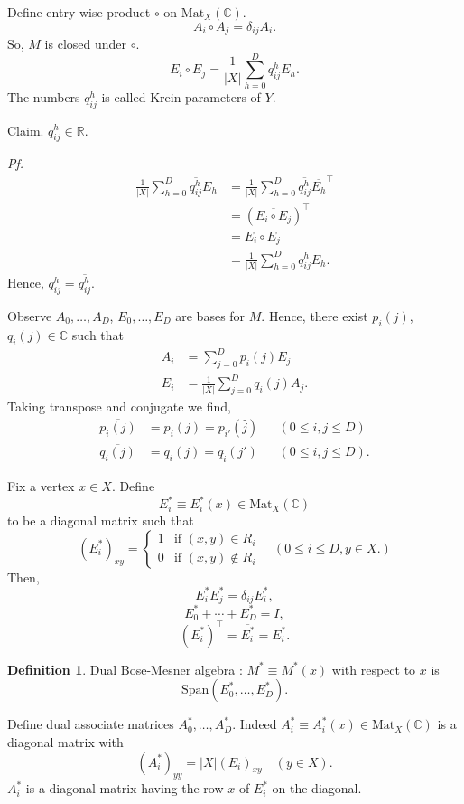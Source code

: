 \documentclass[
]{book}
\theoremstyle{definition}
\newtheorem{definition}{Definition}[chapter]
\theoremstyle{definition}
\theoremstyle{definition}
\theoremstyle{definition}
\theoremstyle{remark}
\begin{document}
Define entry-wise product \(\circ\) on \(\mathrm{Mat}_X(\mathbb{C})\).
\[A_i \circ A_j = \delta_{ij}A_i.\]
So, \(M\) is closed under \(\circ\).
\[E_i \circ E_j = \frac{1}{|X|}\sum_{h=0}^D q^h_{ij}E_h.\]
The numbers \(q^h_{ij}\) is called Krein parameters of \(Y\).

Claim. \(q^h_{ij}\in \mathbb{R}\).

\emph{Pf.}
\begin{align}
\frac{1}{|X|}\sum_{h=0}^D \overline{q^h_{ij}}E_h & = \frac{1}{|X|}\sum_{h=0}^D \overline{q^h_{ij}}\overline{E_h}^\top \\
& = (\overline{E_i\circ E_j})^\top \\
& = E_i\circ E_j \\
& = \frac{1}{|X|}\sum_{h=0}^D q^h_{ij}E_h.
\end{align}
Hence, \(q^h_{ij} = \overline{q^h_{ij}}\).

Observe
\(A_0, \ldots, A_D\), \(E_0, \ldots, E_D\) are bases for \(M\). Hence, there exist \(p_i(j)\), \(q_i(j)\in \mathbb{C}\) such that
\begin{align}
A_i & = \sum_{j = 0}^D p_i(j)E_j\\
E_i & = \frac{1}{|X|}\sum_{j=0}^D q_i(j)A_j.
\end{align}
Taking transpose and conjugate we find,
\begin{align}
\overline{p_i(j)} & =  p_i(j)  =  p_{i'}(\hat{j}) && (0\leq i,j\leq D)\\
\overline{q_i(j)} & =  q_i(j)  =  q_{\hat{i}}({j}') && (0\leq i,j\leq D).
\end{align}

Fix a vertex \(x\in X\). Define
\[E^*_i \equiv E^*_i(x) \in \mathrm{Mat}_X(\mathbb{C})\]
to be a diagonal matrix such that
\[(E^*_i)_{xy} = \begin{cases} 1 & \text{if } (x,y)\in R_i\\ 0 & \text{if } (x,y)\not\in R_i
\end{cases} \quad (0\leq i\leq D, y\in X.)\]
Then,
\[E^*_iE^*_j = \delta_{ij}E^*_i,\]
\[E^*_0 + \cdots + E^*_D = I,\]
\[(E^*_i)^\top = \overline{E^*_i} = E^*_i.\]

\begin{definition}
\protect\hypertarget{def:dual-bose-mesner}{}\label{def:dual-bose-mesner}Dual Bose-Mesner algebra : \(M^* \equiv M^*(x)\) with respect to \(x\) is
\[\mathrm{Span}(E^*_0, \ldots, E^*_D).\]
\end{definition}

Define dual associate matrices \(A_0^*, \ldots, A^*_D\).
Indeed \(A^*_i \equiv A^*_i(x)\in \mathrm{Mat}_X(\mathbb{C})\) is a diagonal matrix with
\[(A_i^*)_{yy} = |X|(E_i)_{xy}\quad (y\in X).\]
\(A^*_i\) is a diagonal matrix having the row \(x\) of \(E_i^*\) on the diagonal.
\end{document}
